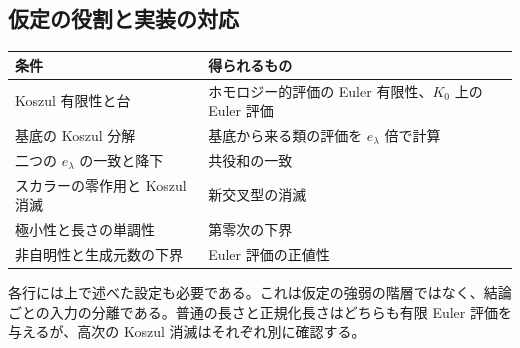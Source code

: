 \documentclass[11pt,a4paper]{ltjsarticle}
\numberwithin{equation}{section}
\theoremstyle{plain}
\theoremstyle{definition}
\theoremstyle{definition}
\begin{document}
\subsection{仮定の役割と実装の対応}\label{sec:planB-todo}\label{sec:planC-lean}

\begin{center}
\small
\begin{tabularx}{\textwidth}{>{\raggedright}p{4.1cm}>{\raggedright\arraybackslash}X}
\toprule
条件 & 得られるもの \\
\midrule
Koszul 有限性と台 & ホモロジー的評価の Euler 有限性、$K_0$ 上の Euler 評価 \\
基底の Koszul 分解 & 基底から来る類の評価を $e_\lambda$ 倍で計算 \\
二つの $e_\lambda$ の一致と降下 & 共役和の一致 \\
スカラーの零作用と Koszul 消滅 & 新交叉型の消滅 \\
極小性と長さの単調性 & 第零次の下界 \\
非自明性と生成元数の下界 & Euler 評価の正値性 \\
\bottomrule
\end{tabularx}
\end{center}
各行には上で述べた設定も必要である。これは仮定の強弱の階層ではなく、結論ごとの入力の分離である。普通の長さと正規化長さはどちらも有限 Euler 評価を与えるが、高次の Koszul 消滅はそれぞれ別に確認する。
\end{document}
